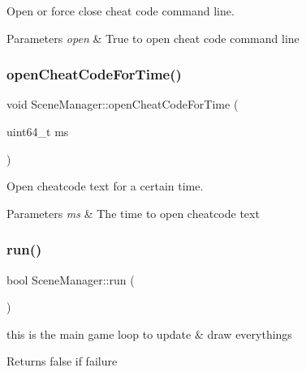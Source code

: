 Open or force close cheat code command line. 


\begin{DoxyParams}{Parameters}
{\em open} & True to open cheat code command line \\
\hline
\end{DoxyParams}
\mbox{\label{class_scene_manager_a06344fee3566d4f109307391a1fdf771}} 
\subsubsection{\texorpdfstring{open\+Cheat\+Code\+For\+Time()}{openCheatCodeForTime()}}
{\footnotesize\ttfamily void Scene\+Manager\+::open\+Cheat\+Code\+For\+Time (\begin{DoxyParamCaption}\item[{uint64\+\_\+t}]{ms }\end{DoxyParamCaption})\hspace{0.3cm}{\ttfamily [static]}}



Open cheatcode text for a certain time. 


\begin{DoxyParams}{Parameters}
{\em ms} & The time to open cheatcode text \\
\hline
\end{DoxyParams}
\mbox{\label{class_scene_manager_a7d88d1c5611d84ca9a08bda535ff46f1}} 
\subsubsection{\texorpdfstring{run()}{run()}}
{\footnotesize\ttfamily bool Scene\+Manager\+::run (\begin{DoxyParamCaption}{ }\end{DoxyParamCaption})\hspace{0.3cm}{\ttfamily [static]}}



this is the main game loop to update \& draw everythings 

\begin{DoxyReturn}{Returns}
false if failure 
\end{DoxyReturn}


